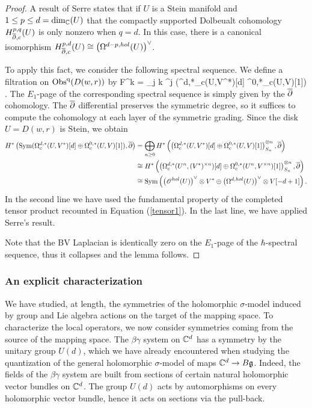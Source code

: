 \begin{proof}
A result of Serre \cite{Serre} states that if $U$ is a Stein manifold and $1 \leq p \leq d = \dim_\mathbb C(U)$ that the compactly supported Dolbeualt cohomology $H^{p,q}_{\overline{\partial}, c}(U)$ is only nonzero when $q = d$.
In this case, there is a canonical isomorphism $H^{p,d}_{\overline{\partial},c}(U) \cong \left(\Omega^{d-p, hol}(U)\right)^\vee$. 

To apply this fact, we consider the following spectral sequence. 
We define a filtration on ${\rm Obs}^{\rm q}(D(w,r))$ by
\ben
F^k = \bigoplus_{j \geq k} \hbar^j \cdot \Sym(\Omega^{d,*}_c(U,V^*)[d] \oplus \Omega^{0,*}_c(U,V)[1]) .
\een
The $E_1$-page of the corresponding spectral sequence is simply given by the $\overline{\partial}$ cohomology.
The $\overline{\partial}$ differential preserves the symmetric degree, so it suffices to compute the cohomology at each layer of the symmetric grading. 
Since the disk $U = D(w,r)$ is Stein, we obtain
\begin{align*}
H^*\left({\rm Sym}(\Omega^{d,*}_c(U,V^*)[d] \oplus \Omega^{0,*}_c(U,V)[1]), \overline{\partial}\right) & = \bigoplus_{n\geq 0} H^*\left( \left(\Omega^{d,*}_c(U,V^*)[d] \oplus \Omega^{0,*}_c(U,V)[1]\right)^{\otimes n}_{S_n}, \overline{\partial}\right) \\ & \cong H^*\left( \left(\Omega^{d,*}_c(U^n,(V^*)^{\times n})[d] \oplus \Omega^{0,*}_c(U^n,V^{\times n})[1]\right)^{\otimes n}_{S_n}, \overline{\partial}\right) \\ & \cong {\rm Sym}\left( \left(\mathscr O^{hol}(U)\right)^\vee \otimes V^* \oplus \left(\Omega^{d,hol}(U)\right)^\vee \otimes V [-d+1] \right) .
\end{align*}
In the second line we have used the fundamental property of the completed tensor product recounted in Equation (\ref{tensor1}).
In the last line, we have applied Serre's result. 

Note that the BV Laplacian is identically zero on the $E_1$-page of the $\hbar$-spectral sequence, thus it collapses and the lemma follows.
\end{proof}

\subsubsection{An explicit characterization}

We have studied, at length, the symmetries of the holomorphic $\sigma$-model induced by group and Lie algebra actions on the target of the mapping space.
To characterize the local operators, we now consider symmetries coming from the source of the mapping space.
The $\beta\gamma$ system on $\mathbb C^d$ has a symmetry by the unitary group $U(d)$, which we have already encountered when studying the quantization of the general holomorphic $\sigma$-model of maps $\mathbb C^d \to B \mathfrak g$. 
Indeed, the fields of the $\beta\gamma$ system are built from sections of certain natural holomorphic vector bundles on $\mathbb C^d$. 
The group $U(d)$ acts by automorphisms on every holomorphic vector bundle, hence it acts on sections via the pull-back. 

